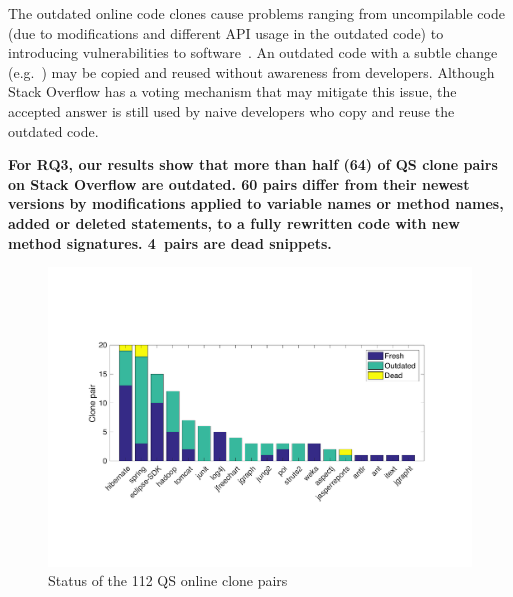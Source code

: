 \documentclass[sigconf,review, anonymous]{acmart}
\begin{document}
The outdated online code clones cause problems ranging from
uncompilable code (due to modifications and different API usage in the
outdated code) to introducing vulnerabilities to
software~\cite{Xia2014}. An outdated code with a subtle change
(e.g.~) may be copied and reused without
awareness from developers. Although Stack Overflow has a voting
mechanism that may mitigate this issue, the accepted answer is still
used by naive developers who copy and reuse the outdated code.

\textbf{For RQ3, our results show that more than half (64) of QS clone
  pairs on Stack Overflow are outdated. 60 pairs differ from their
  newest versions by modifications applied to variable names or method
  names, added or deleted statements, to a fully rewritten code with
  new method signatures. 4~pairs are dead
  snippets.} 


\begin{figure}
	\centering
	\includegraphics[width=\linewidth]{freshness}
	\caption{Status of the 112 QS online clone pairs}
	\label{fig:outdated}
\end{figure}
\end{document}
